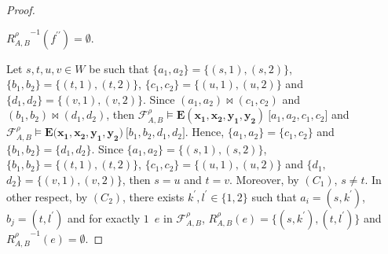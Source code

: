 \documentclass[10pt,a4paper]{amsart}
\begin{document}
\begin{proof}
\begin{description}
\begin{description}
%
%
%
%
%
%
%
%
%
%
%
%
\linebreak$
%
%
%
%
%
%
%
%
%
%
%
%
{R_{A,B}^{\rho}}^{{-}1}(f^{\prime\prime}){=}\emptyset$.
%
%
\end{description}
%
%
\end{description}
%
%
Let $s,t,u,v{\in}W$ be such that $\{a_{1},a_{2}\}{=}\{(s,1),(s,2)\}$, $\{b_{1},b_{2}\}{=}\{(t,1),(t,2)\}$, $\{c_{1},c_{2}\}{=}\{(u,1),(u,2)\}$ and $\{d_{1},d_{2}\}{=}\{(v,1),(v,2)\}$.
Since $(a_{1},a_{2}){\bowtie}(c_{1},c_{2})$ and $(b_{1},b_{2}){\bowtie}(d_{1},d_{2})$, then ${\mathcal F}^{\rho}_{A,B}{\models}\mathbf{E}(\mathbf{x_{1}},\mathbf{x_{2}},\mathbf{y_{1}},\mathbf{y_{2}})\ \lbrack a_{1},a_{2},c_{1},c_{2}\rbrack$ and ${\mathcal F}^{\rho}_{A,B}{\models}\mathbf{E}(\mathbf{x_{1}},
%
%
%
%
%
%
%
%
%
%
%
%
$\linebreak$
%
%
%
%
%
%
%
%
%
%
%
%
\mathbf{x_{2}},\mathbf{y_{1}},\mathbf{y_{2}})\ \lbrack b_{1},b_{2},d_{1},d_{2}\rbrack$.
Hence, %
$\{a_{1},a_{2}\}{=}\{c_{1},c_{2}\}$ and $\{b_{1},b_{2}\}{=}\{d_{1},d_{2}\}$.
Since $\{a_{1},a_{2}\}{=}\{(s,1),(s,2)\}$, $\{b_{1},b_{2}\}{=}\{(t,1),(t,2)\}$, $\{c_{1},c_{2}\}{=}\{(u,1),(u,2)\}$ and $\{d_{1},
%
%
%
%
%
%
%
%
%
%
%
%
$\linebreak$
%
%
%
%
%
%
%
%
%
%
%
%
d_{2}\}{=}\{(v,1),(v,2)\}$, then $s{=}u$ and $t{=}v$.
Moreover, by $(C_{1})$, $s{\not=}t$.
In other respect, by $(C_{2})$, there exists $k^{\prime},l^{\prime}{\in}\{1,2\}$ such that $a_{i}{=}(s,k^{\prime})$, $b_{j}{=}(t,l^{\prime})$ and for exactly $1$~$e$ in ${\mathcal F}_{A,B}^{\rho}$, $R_{A,B}^{\rho}(e){=}\{(s,k^{\prime}),(t,l^{\prime})\}$ and ${R_{A,B}^{\rho}}^{{-}1}(e){=}\emptyset$.

\end{proof}
\end{document}
